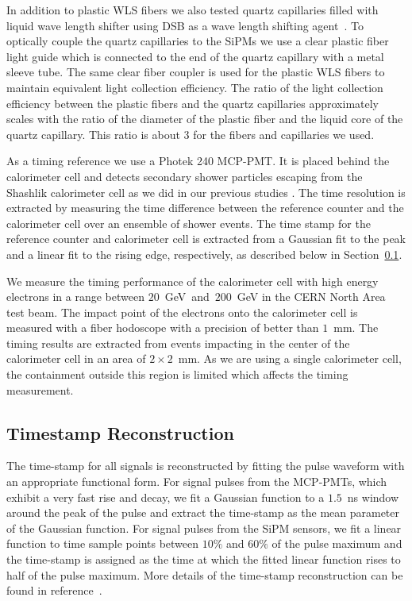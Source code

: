 In addition to plastic WLS fibers we also tested quartz capillaries filled with
liquid wave length shifter using DSB as a wave length shifting
agent~\cite{Baumbaugh:2016vcg}. To optically couple the quartz capillaries to the
SiPMs we use a clear plastic fiber light guide which is connected to the end of
the quartz capillary with a metal sleeve tube. The same clear fiber coupler is
used for the plastic WLS fibers to maintain equivalent light collection
efficiency. The ratio of the light collection efficiency between the plastic
fibers and the quartz capillaries approximately scales with the ratio of the
diameter of the plastic fiber and the liquid core of the quartz capillary. This
ratio is about $3$ for the fibers and capillaries we used.

As a timing reference we use a Photek 240 MCP-PMT. It is placed behind the
calorimeter cell and detects secondary shower particles escaping from the
Shashlik calorimeter cell as we did in our previous studies \cite{Anderson:2015gha}.
The time resolution is extracted by measuring the time difference between the
reference counter and the calorimeter cell over an ensemble of shower events.
The time stamp for the reference counter and calorimeter cell is extracted
from a Gaussian fit to the peak and a linear fit to the rising edge, 
respectively, as described below in Section~\ref{sec:reco}.

We measure the timing performance of the calorimeter cell with high energy
electrons in a range between $20$~GeV~and~$200$~GeV in the CERN North Area test
beam. The impact point of the electrons onto the calorimeter cell is measured
with a fiber hodoscope with a precision of better than $1$~mm. The timing
results are extracted from events impacting in the center of the calorimeter
cell in an area of $2\times2$~mm. As we are using a single calorimeter cell, the
containment outside this region is limited which affects the timing
measurement.

\subsection{Timestamp Reconstruction}
\label{sec:reco}
The time-stamp for all signals is reconstructed by fitting the pulse waveform
with an appropriate functional form. For signal pulses from the MCP-PMTs, which
exhibit a very fast rise and decay, we fit a Gaussian function to a $1.5$~ns
window around the peak of the pulse and extract the time-stamp as the mean
parameter of the Gaussian function. For signal pulses from the SiPM sensors, we
fit a linear function to time sample points between $10\%$ and $60\%$ of the
pulse maximum and the time-stamp is assigned as the time at which the fitted
linear function rises to half of the pulse maximum. More details of the
time-stamp reconstruction can be found in reference~\cite{Anderson:2015gha}.
